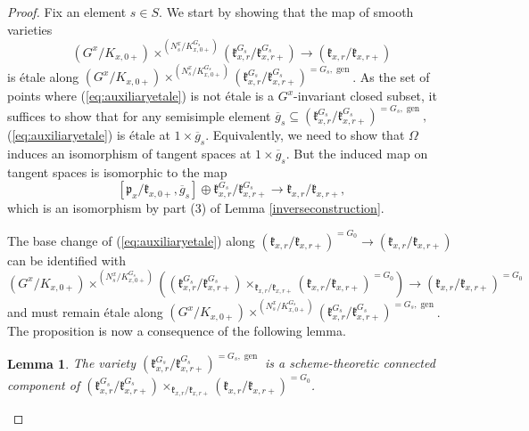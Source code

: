\documentclass[12pt]{article}
\newcommand{\on}{\operatorname}
\newtheorem{lemma}[theorem]{Lemma}
\theoremstyle{remark}
\begin{document}
\begin{proof}
Fix an element $s\in S.$ We start by showing that the map of smooth varieties
\begin{equation}\label{eq:auxiliaryetale}
(G^x/K_{x,0+})\times^{(N^x_s/K_{x,0+}^{G_s})}(\mathfrak{k}_{x,r}^{G_s}/\mathfrak{k}_{x,r+}^{G_s})\rightarrow(\mathfrak{k}_{x,r}/\mathfrak{k}_{x,r+})
\end{equation}
is \'etale along $(G^x/K_{x,0+})\times^{(N^x_s/K_{x,0+}^{G_s})}(\mathfrak{k}_{x,r}^{G_s}/\mathfrak{k}_{x,r+}^{G_s})^{=G_s,\on{gen}}$. As the set of points where (\ref{eq:auxiliaryetale}) is not \'etale is a $G^x$-invariant closed subset, it suffices to show that for any semisimple element $\overline{g}_s\subseteq(\mathfrak{k}_{x,r}^{G_s}/\mathfrak{k}_{x,r+}^{G_s})^{=G_s,\on{gen}},$ (\ref{eq:auxiliaryetale}) is \'etale at $1\times\overline{g}_s.$ Equivalently, we need to show that $\Omega$ induces an isomorphism of tangent spaces at $1\times\overline{g}_s$. But the induced map on tangent spaces is isomorphic to the map
\[
[\mathfrak{p}_x/\mathfrak{k}_{x,0+},\overline{g}_s]\oplus\mathfrak{k}^{G_s}_{x,r}/\mathfrak{k}^{G_s}_{x,r+}\rightarrow\mathfrak{k}_{x,r}/\mathfrak{k}_{x,r+},
\]
which is an isomorphism by part (3) of Lemma \ref{inverseconstruction}.

The base change of (\ref{eq:auxiliaryetale}) along $(\mathfrak{k}_{x,r}/\mathfrak{k}_{x,r+})^{=G_0}\rightarrow (\mathfrak{k}_{x,r}/\mathfrak{k}_{x,r+})$ can be identified with
\[
(G^x/K_{x,0+})\times^{(N^x_s/K_{x,0+}^{G_s})}((\mathfrak{k}_{x,r}^{G_s}/\mathfrak{k}_{x,r+}^{G_s})\times_{\mathfrak{k}_{x,r}/\mathfrak{k}_{x,r+}}(\mathfrak{k}_{x,r}/\mathfrak{k}_{x,r+})^{=G_0})\rightarrow (\mathfrak{k}_{x,r}/\mathfrak{k}_{x,r+})^{=G_0}
\]
and must remain \'etale along $(G^x/K_{x,0+})\times^{(N^x_s/K_{x,0+}^{G_s})}(\mathfrak{k}_{x,r}^{G_s}/\mathfrak{k}_{x,r+}^{G_s})^{=G_s,\on{gen}}$. The proposition is now a consequence of the following lemma.

\begin{lemma}
The variety $(\mathfrak{k}_{x,r}^{G_s}/\mathfrak{k}_{x,r+}^{G_s})^{=G_s,\on{gen}}$ is a scheme-theoretic connected component of $(\mathfrak{k}_{x,r}^{G_s}/\mathfrak{k}_{x,r+}^{G_s})\times_{\mathfrak{k}_{x,r}/\mathfrak{k}_{x,r+}}(\mathfrak{k}_{x,r}/\mathfrak{k}_{x,r+})^{=G_0}$.
\end{lemma}


\end{proof}
\end{document}
